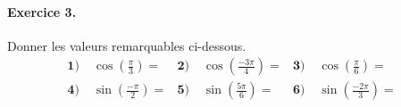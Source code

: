 \documentclass[11pt]{article}
\begin{document}
\paragraph{Exercice 3.} Donner les valeurs remarquables ci-dessous.
\begin{align*}
  \textbf{1)}\; & \cos\left( \frac{\pi}{3} \right) = &
  \textbf{2)}\; & \cos\left( \frac{-3\pi}{4} \right) = &
  \textbf{3)}\; & \cos\left( \frac{\pi}{6} \right) = \\
  \textbf{4)}\; & \sin\left( \frac{-\pi}{2} \right) = &
  \textbf{5)}\; & \sin\left( \frac{5\pi}{6} \right) = &
  \textbf{6)}\; & \sin\left( \frac{-2\pi}{3} \right) =
\end{align*}
\end{document}
